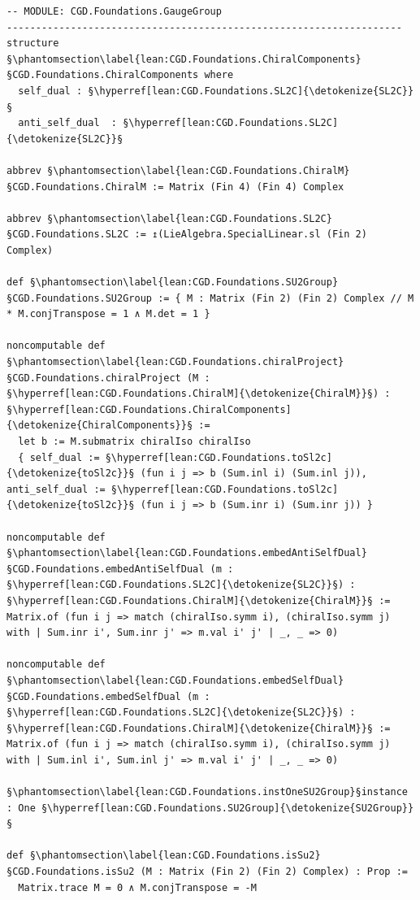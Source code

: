 \begin{verbatim}
-- MODULE: CGD.Foundations.GaugeGroup
--------------------------------------------------------------------
structure §\phantomsection\label{lean:CGD.Foundations.ChiralComponents}§CGD.Foundations.ChiralComponents where
  self_dual : §\hyperref[lean:CGD.Foundations.SL2C]{\detokenize{SL2C}}§
  anti_self_dual  : §\hyperref[lean:CGD.Foundations.SL2C]{\detokenize{SL2C}}§

abbrev §\phantomsection\label{lean:CGD.Foundations.ChiralM}§CGD.Foundations.ChiralM := Matrix (Fin 4) (Fin 4) Complex

abbrev §\phantomsection\label{lean:CGD.Foundations.SL2C}§CGD.Foundations.SL2C := ↥(LieAlgebra.SpecialLinear.sl (Fin 2) Complex)

def §\phantomsection\label{lean:CGD.Foundations.SU2Group}§CGD.Foundations.SU2Group := { M : Matrix (Fin 2) (Fin 2) Complex // M * M.conjTranspose = 1 ∧ M.det = 1 }

noncomputable def §\phantomsection\label{lean:CGD.Foundations.chiralProject}§CGD.Foundations.chiralProject (M : §\hyperref[lean:CGD.Foundations.ChiralM]{\detokenize{ChiralM}}§) : §\hyperref[lean:CGD.Foundations.ChiralComponents]{\detokenize{ChiralComponents}}§ :=
  let b := M.submatrix chiralIso chiralIso
  { self_dual := §\hyperref[lean:CGD.Foundations.toSl2c]{\detokenize{toSl2c}}§ (fun i j => b (Sum.inl i) (Sum.inl j)), anti_self_dual := §\hyperref[lean:CGD.Foundations.toSl2c]{\detokenize{toSl2c}}§ (fun i j => b (Sum.inr i) (Sum.inr j)) }

noncomputable def §\phantomsection\label{lean:CGD.Foundations.embedAntiSelfDual}§CGD.Foundations.embedAntiSelfDual (m : §\hyperref[lean:CGD.Foundations.SL2C]{\detokenize{SL2C}}§) : §\hyperref[lean:CGD.Foundations.ChiralM]{\detokenize{ChiralM}}§ := Matrix.of (fun i j => match (chiralIso.symm i), (chiralIso.symm j) with | Sum.inr i', Sum.inr j' => m.val i' j' | _, _ => 0)

noncomputable def §\phantomsection\label{lean:CGD.Foundations.embedSelfDual}§CGD.Foundations.embedSelfDual (m : §\hyperref[lean:CGD.Foundations.SL2C]{\detokenize{SL2C}}§) : §\hyperref[lean:CGD.Foundations.ChiralM]{\detokenize{ChiralM}}§ := Matrix.of (fun i j => match (chiralIso.symm i), (chiralIso.symm j) with | Sum.inl i', Sum.inl j' => m.val i' j' | _, _ => 0)

§\phantomsection\label{lean:CGD.Foundations.instOneSU2Group}§instance : One §\hyperref[lean:CGD.Foundations.SU2Group]{\detokenize{SU2Group}}§

def §\phantomsection\label{lean:CGD.Foundations.isSu2}§CGD.Foundations.isSu2 (M : Matrix (Fin 2) (Fin 2) Complex) : Prop :=
  Matrix.trace M = 0 ∧ M.conjTranspose = -M


\end{verbatim}
